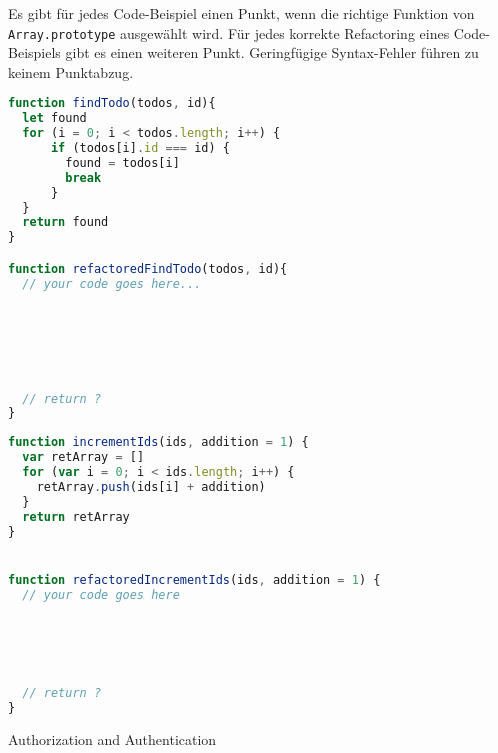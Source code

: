 \documentclass[
addpoints,a4paper,ngerman,answers
]{exam}
\begin{document}
\begin{questions}
\begin{parts}
  Es gibt für jedes Code-Beispiel einen Punkt, wenn die richtige Funktion von
  \texttt{Array.prototype} ausgewählt wird.
  Für jedes korrekte Refactoring eines Code-Beispiels gibt es einen weiteren
  Punkt. Geringfügige Syntax-Fehler führen zu keinem Punktabzug.
  \begin{subparts}
  \subpart[2]
\begin{lstlisting}[extendedchars=true,basicstyle=\ttfamily,language=JavaScript]
function findTodo(todos, id){
  let found
  for (i = 0; i < todos.length; i++) {
      if (todos[i].id === id) {
        found = todos[i]
        break
      }
  }
  return found
}

function refactoredFindTodo(todos, id){
  // your code goes here...






  // return ?
}
\end{lstlisting}
\newpage
\subpart[2]
\begin{lstlisting}[extendedchars=true,basicstyle=\ttfamily,language=JavaScript]
function incrementIds(ids, addition = 1) {
  var retArray = []
  for (var i = 0; i < ids.length; i++) {
    retArray.push(ids[i] + addition)
  }
  return retArray
}


function refactoredIncrementIds(ids, addition = 1) {
  // your code goes here





  // return ?
}
\end{lstlisting}
  \end{subparts}
\end{parts}


\question Authorization and Authentication
\end{questions}
\end{document}
